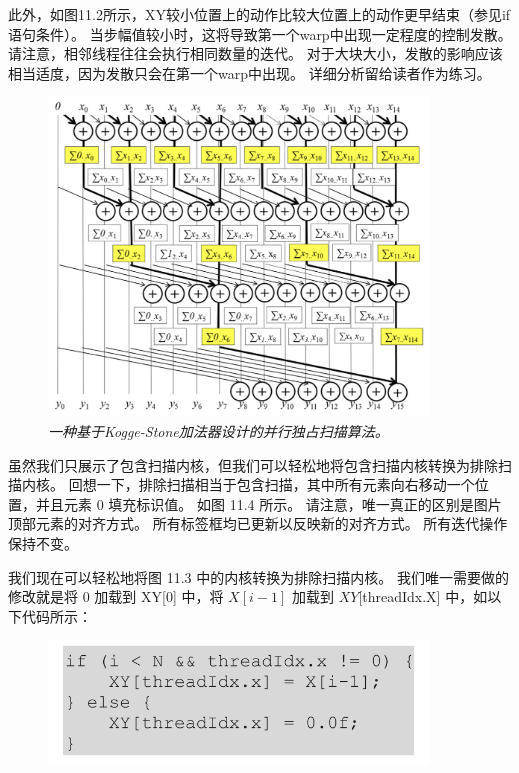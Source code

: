 此外，如图11.2所示，$\mathrm{XY}$较小位置上的动作比较大位置上的动作更早结束（参见if语句条件）。 
当步幅值较小时，这将导致第一个warp中出现一定程度的控制发散。 请注意，相邻线程往往会执行相同数量的迭代。 
对于大块大小，发散的影响应该相当适度，因为发散只会在第一个warp中出现。 详细分析留给读者作为练习。

\begin{figure}[H]
	\centering
	\includegraphics[width=0.9\textwidth]{figs/F11.4.png}
	\caption{\textit{一种基于Kogge-Stone加法器设计的并行独占扫描算法。}}
\end{figure}

虽然我们只展示了包含扫描内核，但我们可以轻松地将包含扫描内核转换为排除扫描内核。 
回想一下，排除扫描相当于包含扫描，其中所有元素向右移动一个位置，并且元素 0 填充标识值。 如图 11.4 所示。 
请注意，唯一真正的区别是图片顶部元素的对齐方式。 所有标签框均已更新以反映新的对齐方式。 所有迭代操作保持不变。

我们现在可以轻松地将图 11.3 中的内核转换为排除扫描内核。 
我们唯一需要做的修改就是将 0 加载到 XY[0] 中，将 $X[i-1]$ 加载到 $XY[$threadIdx.X] 中，如以下代码所示：

\begin{figure}[H]
	\centering
	\includegraphics[width=0.9\textwidth]{figs/F11-a1.png}
\end{figure}

